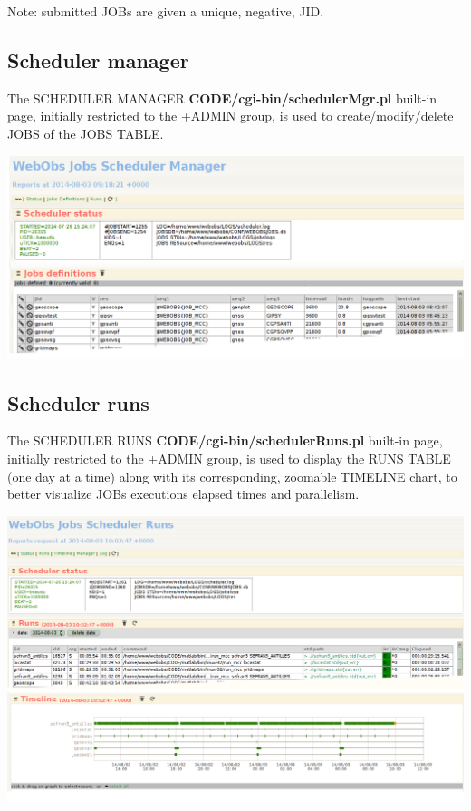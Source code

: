 Note: submitted JOBs are given a unique, negative, JID. 

\subsection{Scheduler manager}

The SCHEDULER MANAGER \textbf{CODE/cgi-bin/schedulerMgr.pl} built-in page, initially restricted to the +ADMIN group, is used to create/modify/delete JOBS of the JOBS TABLE. 

\includegraphics[width=\textwidth]{figures/schedmgr.png}

\subsection{Scheduler runs}

The SCHEDULER RUNS \textbf{CODE/cgi-bin/schedulerRuns.pl} built-in page, 
initially restricted to the +ADMIN group, is used to display the RUNS TABLE (one day at a time) along with its  
corresponding, zoomable TIMELINE chart, to better visualize JOBs executions elapsed times and parallelism. 

\includegraphics[width=\textwidth]{figures/schedrun.png}

